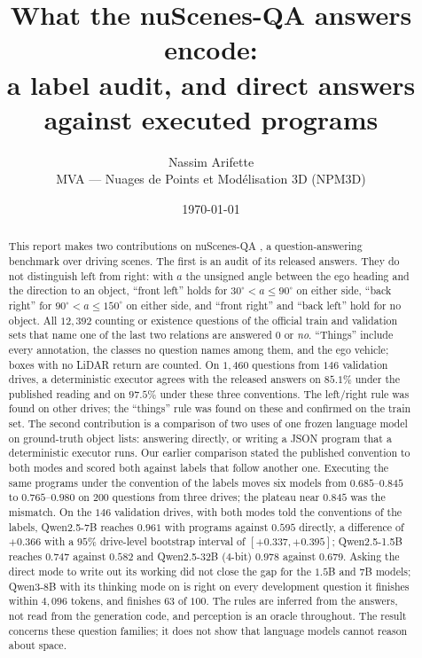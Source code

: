 \documentclass[11pt,a4paper]{article}
\title{\textbf{What the nuScenes-QA answers encode:\\
a label audit, and direct answers\\
against executed programs}}
\author{Nassim Arifette\\
\small MVA --- Nuages de Points et Modélisation 3D (NPM3D)}
\date{\today}
\begin{document}
\maketitle

\begin{abstract}
\noindent
This report makes two contributions on nuScenes-QA \cite{nuscenesqa}, a
question-answering benchmark over driving scenes. The first is an audit of
its released answers. They do not distinguish left from right: with $a$ the
unsigned angle between the ego heading and the direction to an object,
``front left'' holds for $30^{\circ} < a \le 90^{\circ}$ on either side,
``back right'' for $90^{\circ} < a \le 150^{\circ}$ on either side, and
``front right'' and ``back left'' hold for no object. All $12{,}392$ counting
or existence questions of the official train and validation sets that name
one of the last two relations are answered $0$ or \emph{no}. ``Things''
include every annotation, the classes no question names among them, and the
ego vehicle; boxes with no LiDAR return are counted. On $1{,}460$ questions
from $146$ validation drives, a deterministic executor agrees with the
released answers on $85.1\%$ under the published reading and on $97.5\%$
under these three conventions. The left/right rule was found on other
drives; the ``things'' rule was found on these and confirmed on the train
set. The second
contribution is a comparison of two uses of one frozen language model on
ground-truth object lists: answering directly, or writing a JSON program that
a deterministic executor runs. Our earlier comparison stated the published
convention to both modes and scored both against labels that follow another
one. Executing the same programs under the convention of the labels moves six
models from $0.685$--$0.845$ to $0.765$--$0.980$ on $200$ questions from
three drives; the plateau near $0.845$ was the mismatch. On the $146$
validation drives, with both modes told the conventions of the labels,
Qwen2.5-7B reaches $0.961$ with programs against $0.595$ directly, a
difference of $+0.366$ with a $95\%$ drive-level bootstrap interval of
$[+0.337, +0.395]$; Qwen2.5-1.5B reaches $0.747$ against $0.582$ and
Qwen2.5-32B ($4$-bit) $0.978$ against $0.679$. Asking the direct mode to
write out its working did not close the gap for the $1.5$B and $7$B models; Qwen3-8B with its thinking mode on is right on every development question it finishes within $4{,}096$ tokens, and finishes $63$ of $100$. The rules are inferred from the answers, not read from the generation
code, and perception is an oracle throughout. The result concerns these
question families; it does not show that language models cannot reason about
space.
\end{abstract}
\end{document}
